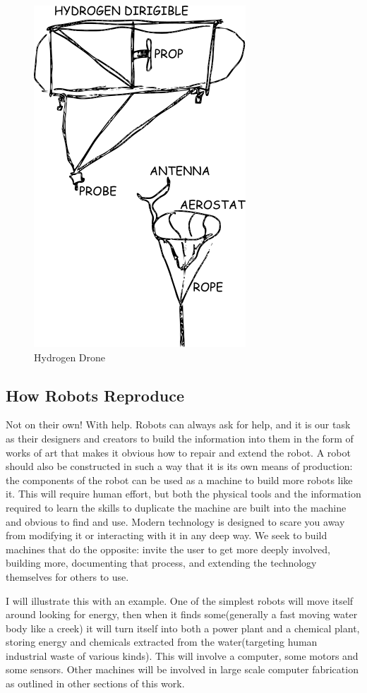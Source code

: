 \begin{figure}[htbp]
\centering
\includegraphics{images/dirigible.png}
\caption{Hydrogen Drone}
\end{figure}

\subsection{How Robots Reproduce}\label{how-robots-reproduce}

Not on their own! With help. Robots can always ask for help, and it is
our task as their designers and creators to build the information into
them in the form of works of art that makes it obvious how to repair and
extend the robot. A robot should also be constructed in such a way that
it is its own means of production: the components of the robot can be
used as a machine to build more robots like it. This will require human
effort, but both the physical tools and the information required to
learn the skills to duplicate the machine are built into the machine and
obvious to find and use. Modern technology is designed to scare you away
from modifying it or interacting with it in any deep way. We seek to
build machines that do the opposite: invite the user to get more deeply
involved, building more, documenting that process, and extending the
technology themselves for others to use.

I will illustrate this with an example. One of the simplest robots will
move itself around looking for energy, then when it finds some(generally
a fast moving water body like a creek) it will turn itself into both a
power plant and a chemical plant, storing energy and chemicals extracted
from the water(targeting human industrial waste of various kinds). This
will involve a computer, some motors and some sensors. Other machines
will be involved in large scale computer fabrication as outlined in
other sections of this work.

